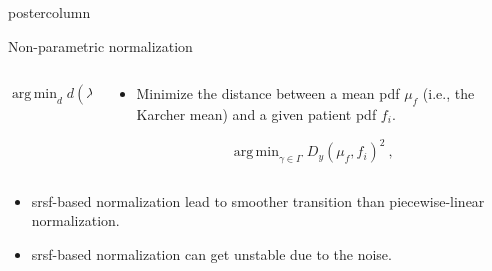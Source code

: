 \documentclass[final, size=a0]{beamer}
\DeclareMathOperator*{\argmin}{arg\,min}
\begin{document}
\begin{frame}
\begin{columns}
\begin{column}{.33\textwidth}
\begin{beamercolorbox}[center,wd=\textwidth]{postercolumn}
\begin{minipage}[T]{.95\textwidth}
{\begin{alertblock}{Non-parametric normalization}
\begin{columns}
\begin{column}{.5\textwidth}
                  \begin{equation}
                    \argmin_{d} d(\lambda_i, \mu_i) \ ,
                  \end{equation}
                \end{column}
                \begin{column}{.5\textwidth}
                  \begin{itemize}
                    \justifying
                  \item Minimize the distance between a mean \acs{pdf} $\mu_f$ (i.e., the Karcher mean) and a given patient \ac{pdf} $f_i$.
                  \end{itemize}

                  \vspace{.1cm}

                  \begin{equation}
                    \argmin_{\gamma \in \Gamma} D_y(\mu_f, f_i)^2 \ ,
                  \end{equation}
                \end{column}
              \end{columns}

              \vspace{1cm}

              \begin{itemize}
                \justifying
              \item \acs{srsf}-based normalization lead to smoother transition than piecewise-linear normalization.
              \item \acs{srsf}-based normalization can get unstable due to the noise.
              \end{itemize}

            \end{alertblock}

            \vspace{2cm}            
            
}
\end{minipage}
\end{beamercolorbox}
\end{column}
\end{columns}
\end{frame}
\end{document}
